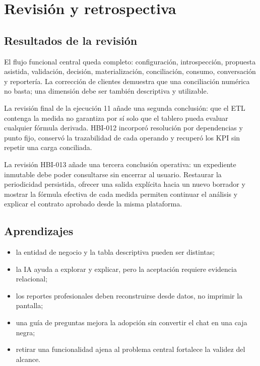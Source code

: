 \documentclass[11pt,letterpaper]{article}
\begin{document}
\section{Revisión y retrospectiva}

\subsection{Resultados de la revisión}

El flujo funcional central queda completo: configuración, introspección, propuesta asistida, validación, decisión, materialización, conciliación, consumo, conversación y reportería. La corrección de clientes demuestra que una conciliación numérica no basta; una dimensión debe ser también descriptiva y utilizable.

La revisión final de la ejecución 11 añade una segunda conclusión: que el ETL contenga la medida no garantiza por sí solo que el tablero pueda evaluar cualquier fórmula derivada. HBI-012 incorporó resolución por dependencias y punto fijo, conservó la trazabilidad de cada operando y recuperó los KPI sin repetir una carga conciliada.

La revisión HBI-013 añade una tercera conclusión operativa: un expediente inmutable debe poder consultarse sin encerrar al usuario. Restaurar la periodicidad persistida, ofrecer una salida explícita hacia un nuevo borrador y mostrar la fórmula efectiva de cada medida permiten continuar el análisis y explicar el contrato aprobado desde la misma plataforma.

\subsection{Aprendizajes}

\begin{itemize}
  \item la entidad de negocio y la tabla descriptiva pueden ser distintas;
  \item la IA ayuda a explorar y explicar, pero la aceptación requiere evidencia relacional;
  \item los reportes profesionales deben reconstruirse desde datos, no imprimir la pantalla;
  \item una guía de preguntas mejora la adopción sin convertir el chat en una caja negra;
  \item retirar una funcionalidad ajena al problema central fortalece la validez del alcance.
\end{itemize}
\end{document}
